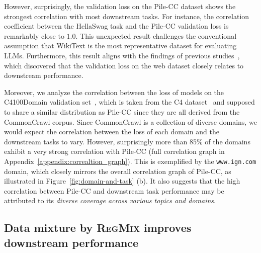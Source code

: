 \documentclass{article}
\theoremstyle{definition}
\theoremstyle{remark}
\newcommand{\ourmethod}{\textsc{RegMix}\xspace}
\begin{document}
However, surprisingly, the validation loss on the Pile-CC dataset shows the strongest correlation with most downstream tasks. For instance, the correlation coefficient between the HellaSwag task and the Pile-CC validation loss is remarkably close to $1.0$.
This unexpected result challenges the conventional assumption that WikiText is the most representative dataset for evaluating LLMs.
Furthermore, this result aligns with the findings of previous studies~\citep{gadre2024language, huang2024compression}, which discovered that the validation loss on the web dataset closely relates to downstream performance. 

Moreover, we analyze the correlation between the loss of models on the C4100Domain validation set~\citep{paloma2023allen}, which is taken from the C4 dataset~\citep{2019t5} and supposed to share a similar distribution as Pile-CC since they are all derived from the CommonCrawl corpus. Since CommonCrawl is a collection of diverse domains, we would expect the correlation between the loss of each domain and the downstream tasks to vary. However, surprisingly more than 85\% of the domains exhibit a very strong correlation with Pile-CC (full correlation graph in Appendix~\ref{appendix:correaltion_graph}).
This is exemplified by the \texttt{www.ign.com} domain, which closely mirrors the overall correlation graph of Pile-CC, as illustrated in Figure~\ref{fig:domain-and-task} (b).
It also suggests that the high correlation between Pile-CC and downstream task performance may be attributed to its \textit{diverse coverage across various topics and domains}.

\subsection{Data mixture by \ourmethod improves downstream performance}
\label{sec:no_pile_exper}
\end{document}

